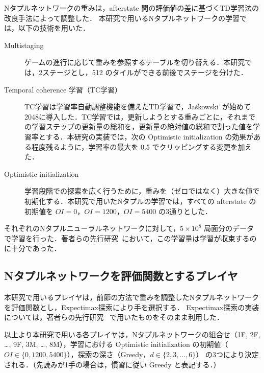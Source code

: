Nタプルネットワークの重みは，afterstate 間の評価値の差に基づくTD学習法の改良手法によって調整した．
本研究で用いるNタプルネットワークの学習では，以下の技術を用いた．
\begin{description}
  \item [Multistaging] ゲームの進行に応じて重みを参照するテーブルを切り替える．本研究では，2ステージとし，512 のタイルができる前後でステージを分けた．
  \item [Temporal coherence 学習（TC学習）] TC学習は学習率自動調整機能を備えたTD学習で，Ja\'{s}kowski~\cite{Jask17}が始めて2048に導入した．TC学習では，更新しようとする重みごとに，それまでの学習ステップの更新量の総和を，更新量の絶対値の総和で割った値を学習率とする．本研究の実装では，次の Optimistic initialization の効果がある程度残るように，学習率の最大を 0.5 でクリッピングする変更を加えた．
  \item [Optimistic initialization] 学習段階での探索を広く行うために，重みを（ゼロではなく）大きな値で初期化する．本研究で用いたNタプルの学習では，すべての afterstate の初期値を $\mathit{OI}=0$，$\mathit{OI}=1200$，$\mathit{OI}=5400$ の3通りとした．
\end{description}

それぞれのNタプルニューラルネットワークに対して，$5\times 10^8$ 局面分のデータで学習を行った．著者らの先行研究~\cite{TeKM23}において，この学習量は学習が収束するのに十分であった．

\subsection{Nタプルネットワークを評価関数とするプレイヤ}

本研究で用いるプレイヤは，前節の方法で重みを調整したNタプルネットワークを評価関数とし，Expectimax探索により手を選択する．
Expectimax探索の実装については，著者らの先行研究~\cite{Terauchi24} で用いたものをそのまま利用した．

以上より本研究で用いる各プレイヤは，Nタプルネットワークの組合せ（\textsf{1F}, \textsf{2F}, \ldots, \textsf{9F}, \textsf{3M}, \ldots, \textsf{8M}），学習における Optimistic initialization の初期値（$\mathit{OI}\in \{0, 1200, 5400\}$），探索の深さ（Greedy，$d\in \{2, 3, \ldots, 6\}$） の3つにより決定される．（先読みが1手の場合は，慣習に従い Greedy と表記する．）

